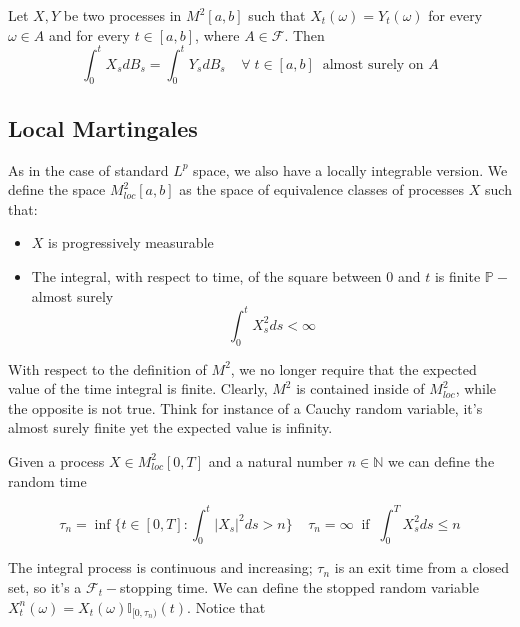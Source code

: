\begin{theorem}
    Let $X,Y$ be two processes in $M^2[a,b]$ such that
    $X_t(\omega) = Y_t(\omega)$ for every $\omega \in A$ and for every $t \in [a,b]$, where $A \in \mathcal{F}$. Then
    \begin{equation*}
        \int_0^t X_s dB_s = \int_0^t Y_s dB_s \;\; \;   \; \forall \; t \in [a,b] \;\; \text{almost surely on $A$}
    \end{equation*}
\end{theorem}

\subsection{Local Martingales}
As in the case of standard $L^p$ space, we also have a locally integrable version. We define the space $M^2_{loc}[a,b]$ as the space of equivalence classes of processes $X$ such that:
\begin{itemize}
    \item $X$ is progressively measurable
    \item The integral, with respect to time, of the square between $0$ and $t$ is finite $\mathbb{P}-$almost surely
    \begin{equation*}
        \int_0^t X_s^2 ds < \infty
    \end{equation*}
\end{itemize}

With respect to the definition of $M^2$, we no longer require that the expected value of the time integral is finite. Clearly, $M^2$ is contained inside of $M^2_{loc}$, while the opposite is not true. Think for instance of a Cauchy random variable, it's almost surely finite yet the expected value is infinity. 

Given a process $X \in M^2_{loc}[0,T]$ and a natural number $n \in \mathbb{N}$ we can define the random time

\begin{equation}
    \tau_n = \inf\Big\{ t \in [0,T] : \int_0^t \vert X_s \vert^2 ds > n \Big\} \;\;\;\; \tau_n = \infty \;\; \text{if} \;\; \int_0^T X_s^2 ds \leq n
\end{equation}

The integral process is continuous and increasing; $\tau_n$ is an exit time from a closed set, so it's a $\mathcal{F}_t-$stopping time. We can define the stopped random variable $X_{t}^n(\omega) = X_t(\omega) \mathbb{I}_{[0,\tau_n)}(t)$. Notice that

